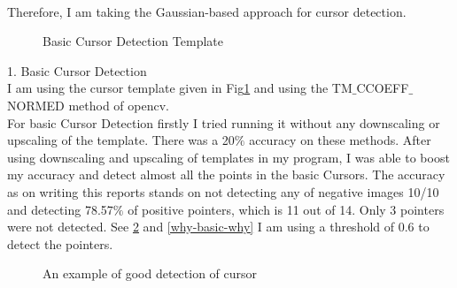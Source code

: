 \documentclass[12pt]{article}
\newenvironment{QandA}
{
	\begin{enumerate}[label=\normalfont\arabic*.,leftmargin=2em,rightmargin=2em]\normalfont
	}
	{
	\end{enumerate}
}
\newenvironment{answered}{\setlength{\parindent}{1em}\par\normalfont}{}
\begin{document}
\begin{QandA}
\begin{answered}
\\
Therefore, I am taking the Gaussian-based approach for cursor detection.
\begin{figure}
		\centering
  			\caption{Basic Cursor Detection Template}
  		\label{basic-template}
\end{figure}
1. Basic Cursor Detection
\\
I am using the cursor template given in Fig{\ref{basic-template}} and using the TM$\_$CCOEFF$\_$NORMED method of opencv.
\\
For basic Cursor Detection firstly I tried running it without any downscaling or upscaling of the template. There was a 20$\%$ accuracy on these methods. After using downscaling and upscaling of templates in my program, I was able to boost my accuracy and detect almost all the points in the basic Cursors. The accuracy as on writing this reports stands on not detecting any of negative images 10/10 and detecting 78.57$\%$ of positive pointers, which is 11 out of 14. Only 3 pointers were not detected. See {\ref{wow-basic-wow} and \ref{why-basic-why} } I am using a threshold of 0.6 to detect the pointers.
\begin{figure}
		\centering
  			\caption{An example of good detection of cursor}
  		\label{wow-basic-wow}
\end{figure}
\begin{figure}
		\centering

\end{figure}
\end{answered}
\end{QandA}
\end{document}
